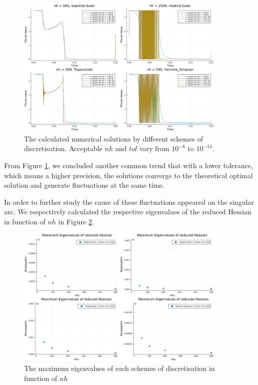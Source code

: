 \documentclass{article}
\begin{document}
\begin{figure}[ht]
    \centering
    \includegraphics[width = 0.9\textwidth]{default nh.png}
    \caption{\label{fig:acceptnh} The calculated numerical solutions by different schemes of discretisation. Acceptable $nh$ and $tol$ vary from $10^{-6}$ to $10^{-14}$.}
\end{figure}

From Figure \ref{fig:acceptnh}, we concluded another common trend that with a lower tolerance, which means a higher precision, the solutions converge to the theoretical optimal solution and generate fluctuations at the same time. 

In order to further study the cause of these fluctuations appeared on the singular arc. We respectively calculated the respective eigenvalues of the reduced Hessian in function of $nh$ in Figure \ref{fig:eig}.
\begin{figure}[ht]
    \centering
    \includegraphics[width = 0.9\textwidth]{maximum eig_nh.png}
    \caption{\label{fig:eig} The maximum eigenvalues of each schemes of discretisation in function of $nh$}
\end{figure}
\end{document}
